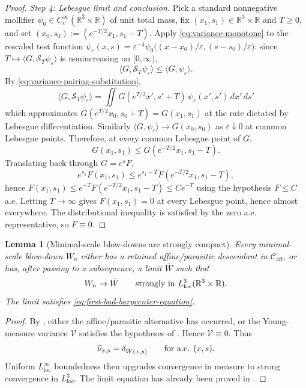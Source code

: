 \documentclass[11pt]{amsart}
\numberwithin{equation}{section}
\theoremstyle{plain}
\newtheorem{lemma}[lemma]{Lemma}
\theoremstyle{definition}
\theoremstyle{remark}
\newcommand{\loc}{\mathrm{loc}}
\newcommand{\Caff}{\mathcal C_{\mathrm{aff}}}
\begin{document}
\begin{proof}
\emph{Step 4: Lebesgue limit and conclusion.}  Pick a standard nonnegative
mollifier \(\psi_0\in C_c^\infty(\mathbb R^3\times\mathbb R)\) of unit total
mass, fix \((x_1,s_1)\in\mathbb R^3\times\mathbb R\) and \(T\ge 0\), and set
\((x_0,s_0):=(e^{-T/2}x_1,s_1-T)\).  Apply
\eqref{eq:variance-monotone} to the rescaled test function
\(\psi_\varepsilon(x,s)=\varepsilon^{-4}\psi_0\bigl((x-x_0)/\varepsilon,(s-s_0)/\varepsilon\bigr)\):
since \(T\mapsto\langle G,\mathcal S_T\psi_\varepsilon\rangle\) is
nonincreasing on \([0,\infty)\),
\[
   \langle G,\mathcal S_T\psi_\varepsilon\rangle
   \le
   \langle G,\psi_\varepsilon\rangle .
\]
By \eqref{eq:variance-pairing-substitution},
\[
   \langle G,\mathcal S_T\psi_\varepsilon\rangle
   =\iint G(e^{T/2}x',s'+T)\,\psi_\varepsilon(x',s')\,dx'\,ds'
\]
which approximates \(G(e^{T/2}x_0,s_0+T)=G(x_1,s_1)\) at the rate dictated by
Lebesgue differentiation.  Similarly \(\langle G,\psi_\varepsilon\rangle\to
G(x_0,s_0)\) as \(\varepsilon\downarrow 0\) at common Lebesgue points.
Therefore, at every common Lebesgue point of \(G\),
\[
   G(x_1,s_1)\le G(e^{-T/2}x_1,s_1-T) .
\]
Translating back through \(G=e^sF\),
\begin{equation}\label{eq:variance-monotone-along-char}
   e^{s_1}F(x_1,s_1)\le e^{s_1-T}F(e^{-T/2}x_1,s_1-T) ,
\end{equation}
hence \(F(x_1,s_1)\le e^{-T}F(e^{-T/2}x_1,s_1-T)\le Ce^{-T}\) using the
hypothesis \(F\le C\) a.e.  Letting \(T\to\infty\) gives \(F(x_1,s_1)=0\) at
every Lebesgue point, hence almost everywhere.  The distributional inequality
is satisfied by the zero a.e. representative, so \(F\equiv 0\).
\end{proof}

\begin{lemma}[Minimal-scale blow-downs are strongly compact]
\label{lem:first-bad-strong-compactness}
Every minimal-scale blow-down \(W_n\) either has a retained affine/parasitic
descendant in \(\Caff\), or has, after passing to a subsequence, a limit
\(\bar W\) such that
\[
   W_n\to\bar W
   \qquad\hbox{strongly in }L^3_{\loc}(\mathbb R^3\times\mathbb R).
\]
The limit satisfies \eqref{eq:first-bad-barycenter-equation}.
\end{lemma}

\begin{proof}
By , either the affine/parasitic alternative
has occurred, or the Young-measure variance \(\mathcal V\) satisfies the
hypotheses of
.  Hence \(\mathcal V\equiv0\).  Thus
\[
   \widetilde\nu_{x,s}=\delta_{\bar W(x,s)}
   \qquad\hbox{for a.e. }(x,s).
\]
Uniform \(L^\infty_{\loc}\) boundedness then upgrades convergence in measure to
strong convergence in \(L^3_{\loc}\).  The limit equation has already been
proved in .
\end{proof}
\end{document}
